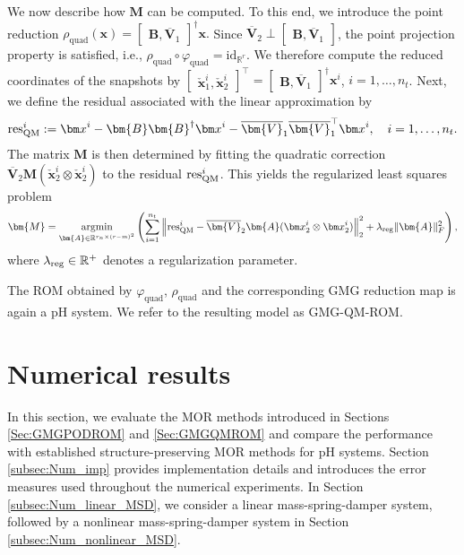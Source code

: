 \documentclass{article}
\newcommand{\argmin}{ \mathop{ \mathrm{argmin} } }
\newcommand{\bmA}{\bm{A}}
\newcommand{\bmV}{\bm{V}}
\newcommand{\bmB}{\bm{B}}
\newcommand{\bmM}{\bm{M}}
\newcommand{\R}{\mathbb{R}}
\newcommand{\statex}{{\bm x}}
\newcommand{\stateRed}{\check{\bm x}}
\newcommand{\snapsize}{n_t}
\newcommand{\portsize}{m}
\newcommand{\ROMsize}{r}
\newcommand{\nlsize}{r_n}
\newcommand{\approxfunc}{\varphi}
\newcommand{\VPODQMone}{\overline{\bmV}_{1}}
\newcommand{\VPODQMtwo}{\overline{\bmV}_{2}}
\newcommand{\pH}{\textsf{pH}\xspace}
\newcommand{\GMG}{\textsf{GMG}\xspace}
\newcommand{\QM}{\textsf{QM}\xspace} %
\newcommand{\ROM}{\textsf{ROM}\xspace}
\newcommand{\MOR}{\textsf{MOR}\xspace}
\begin{document}
	We now describe how $\bmM$ can be computed. To this end, we introduce the point reduction $\rho_{\text{quad}}(\statex)=
	\begin{bmatrix}
		\bmB,\VPODQMone
	\end{bmatrix}^{\dagger} \statex.
	$
	Since
	$\VPODQMtwo\perp
	\begin{bmatrix}
		\bmB,\VPODQMone
	\end{bmatrix}$, the point projection property is satisfied, i.e., $\rho_{\text{quad}} \circ \approxfunc_{\text{quad}}=\text{id}_{\R^{r}}.$ We therefore compute the reduced coordinates of the snapshots by $\begin{bmatrix}\stateRed_1^i, \stateRed_2^i\end{bmatrix}^\top= 		\begin{bmatrix}
		\bmB,\VPODQMone
	\end{bmatrix}^{\dagger} \statex^i$, $i=1, \ldots, \snapsize$. 
	Next, we define the residual associated with the linear approximation by 
	\begin{align*}
		\textnormal{res}^{i}_{\rm{QM}} := \statex^i - \bmB\bmB^{\dagger}\statex^i-\VPODQMone\VPODQMone^{\top}\statex^i, \quad i=1,\dots,\snapsize.
	\end{align*}
	The matrix $\bmM$ is then determined by fitting the quadratic correction $\VPODQMtwo\bmM(\stateRed_2^i\otimes\stateRed_2^i)$ to the residual $\textnormal{res}^{i}_{\mathrm{QM}}$. This yields the regularized least squares problem
	\begin{align}
		\label{equ:least_square_reg}
		\bmM = \argmin_{\bmA\in\R^{\nlsize\times (\ROMsize-\portsize)^2}}\left(
		\sum_{i=1}^{\snapsize}
		\left\|
		\textnormal{res}_{\rm{QM}}^{i}
		-
		\VPODQMtwo\bmA (\statex_2^i \otimes\statex_2^i)
		\right\|_2^2
		+\lambda_{\rm reg} \|\bmA\|_F^2
		\right),
	\end{align}
	where $\lambda_{\rm reg} \in\R^{+}$ denotes a regularization parameter. 
	 
	The \ROM obtained by $\approxfunc_{\text{quad}}$, $\rho_{\text{quad}}$ and the corresponding \GMG reduction map is again a \pH system. 
	We refer to the resulting model as \GMG-\QM-\ROM. 

\section{Numerical results}
\label{Sec:Numerical_results}

In this section, we evaluate the \MOR methods introduced in Sections \ref{Sec:GMGPODROM} and \ref{Sec:GMGQMROM} and compare the performance with established structure-preserving \MOR methods for \pH systems. 
Section \ref{subsec:Num_imp} provides implementation details and introduces the error measures used throughout the numerical experiments. 
In Section \ref{subsec:Num_linear_MSD}, we consider a linear mass-spring-damper system, followed by a nonlinear mass-spring-damper system in Section \ref{subsec:Num_nonlinear_MSD}.
\end{document}
